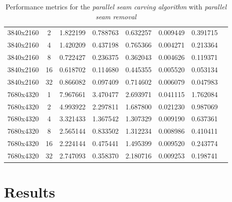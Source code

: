 \documentclass{article}
\begin{document}
\begin{table}[H]
\begin{tabular}{lccccccc}
        3840x2160 & 2  & 1.822199 & 0.788763 & 0.632257 & 0.009449 & 0.391715 \\
        3840x2160 & 4  & 1.420209 & 0.437198 & 0.765366 & 0.004271 & 0.213364 \\
        3840x2160 & 8  & 0.722427 & 0.236375 & 0.362043 & 0.004626 & 0.119371 \\
        3840x2160 & 16 & 0.618702 & 0.114680 & 0.445355 & 0.005520 & 0.053134 \\
        3840x2160 & 32 & 0.866082 & 0.097409 & 0.714602 & 0.006079 & 0.047983 \\
        \midrule
        7680x4320 & 1  & 7.967661 & 3.470477 & 2.693971 & 0.041115 & 1.762084 \\
        7680x4320 & 2  & 4.993922 & 2.297811 & 1.687800 & 0.021230 & 0.987069 \\
        7680x4320 & 4  & 3.321433 & 1.367542 & 1.307329 & 0.009190 & 0.637361 \\
        7680x4320 & 8  & 2.565144 & 0.833502 & 1.312234 & 0.008986 & 0.410411 \\
        7680x4320 & 16 & 2.224144 & 0.475441 & 1.495399 & 0.009520 & 0.243774 \\
        7680x4320 & 32 & 2.747093 & 0.358370 & 2.180716 & 0.009253 & 0.198741 \\
        \bottomrule
    \end{tabular}
    \caption{Performance metrics for the \textit{parallel seam carving algorithm} with \textit{parallel seam removal}}
    \label{tab:performance_data_new}
\end{table}


\section{Results}
\end{document}
